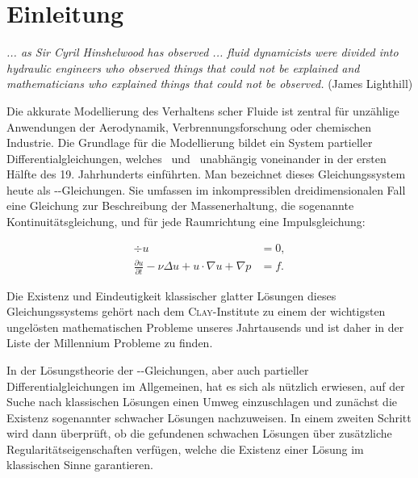 \chapter*{Einleitung}

\begin{addmargin}[2em]{2em}%
  \textit{... as Sir Cyril Hinshelwood has observed ... fluid dynamicists
were divided into hydraulic engineers who observed things that
could not be explained and mathematicians who explained things
that could not be observed.} 
  \flushright(James Lighthill)
\end{addmargin}
\vspace{1.5cm}

Die akkurate Modellierung des Verhaltens \newton scher Fluide ist zentral für unzählige Anwendungen der Aerodynamik, Verbrennungsforschung oder chemischen Industrie.
Die Grundlage für die Modellierung bildet ein System partieller Differentialgleichungen, welches \navier\ und \stokes\ unabhängig voneinander in der ersten Hälfte des 19. Jahrhunderts einführten. 
Man bezeichnet dieses Gleichungssystem heute als \navier\hyp\stokes\hyp{}Gleichungen.
Sie umfassen im inkompressiblen dreidimensionalen Fall eine Gleichung zur Beschreibung der Massenerhaltung, die sogenannte Kontinuitätsgleichung, und für jede Raumrichtung eine Impulsgleichung:

\begin{align*}
  \div u &= 0, \\
  \frac{\partial u}{\partial t} - \nu \Delta u + u \cdot \nabla u + \nabla p &= f.
\end{align*}

Die Existenz und Eindeutigkeit klassischer glatter Lösungen dieses Gleichungssystems gehört nach dem \textsc{Clay}\hyp{}Institute zu einem der wichtigsten ungelösten mathematischen Probleme unseres Jahrtausends und ist daher in der Liste der Millennium Probleme zu finden.

In der Lösungstheorie der \navier\hyp\stokes\hyp{}Gleichungen, aber auch partieller Differentialgleichungen im Allgemeinen, hat es sich als nützlich erwiesen, auf der Suche nach klassischen Lösungen einen Umweg einzuschlagen und zunächst die Existenz sogenannter schwacher Lösungen nachzuweisen.
In einem zweiten Schritt wird dann überprüft, ob die gefundenen schwachen Lösungen über zusätzliche Regularitätseigenschaften verfügen, welche die Existenz einer Lösung im klassischen Sinne garantieren.

